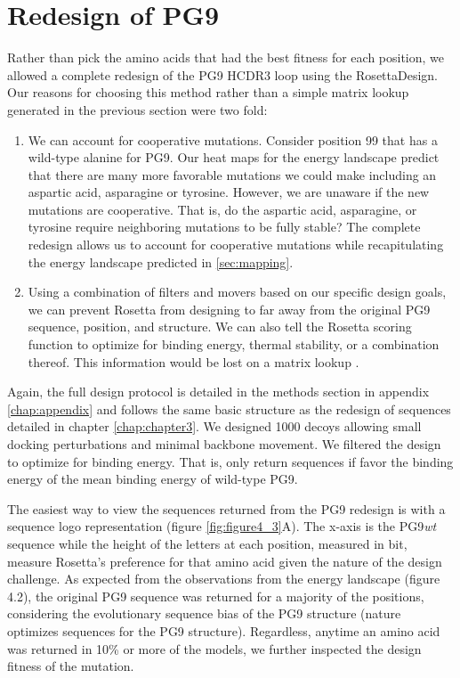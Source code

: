 \section{Redesign of PG9}
Rather than pick the amino acids that had the best fitness for each position, we allowed a complete redesign of the PG9 HCDR3 loop using the RosettaDesign. Our reasons for choosing this method rather than a simple matrix lookup generated in the previous section were two fold:
\begin{enumerate}
\item We can account for cooperative mutations. Consider position 99 that has a wild-type alanine for PG9. Our heat maps for the energy landscape predict that there are many more favorable mutations we could make including an aspartic acid, asparagine or tyrosine. However, we are unaware if the new mutations are cooperative. That is, do the aspartic acid, asparagine, or tyrosine require neighboring mutations to be fully stable? The complete redesign allows us to account for cooperative mutations while recapitulating the energy landscape predicted in \ref{sec:mapping}.
\item Using a combination of filters and movers based on our specific design goals, we can prevent Rosetta from designing to far away from the original PG9 sequence, position, and structure. We can also tell the Rosetta scoring function to optimize for binding energy, thermal stability, or a combination thereof. This information would be lost on a matrix lookup \citep{Fleishman:2011ji,Kaufmann:2010ea,Kuhlman:2000tc}.
\end{enumerate}

Again, the full design protocol is detailed in the methods section in appendix \ref{chap:appendix} and follows the same basic structure as the redesign of sequences detailed in chapter \ref{chap:chapter3}. We designed 1000 decoys allowing small docking perturbations and minimal backbone movement. We filtered the design to optimize for binding energy. That is, only return sequences if favor the binding energy of the mean binding energy of wild-type PG9.

The easiest way to view the sequences returned from the PG9 redesign is with a sequence logo representation (figure \ref{fig:figure4_3}A). The x-axis is the PG9\textit{wt} sequence while the height of the letters at each position, measured in bit, measure Rosetta's preference for that amino acid given the nature of the design challenge. As expected from the observations from the energy landscape (figure 4.2), the original PG9 sequence was returned for a majority of the positions, considering the evolutionary sequence bias of the PG9 structure (nature optimizes sequences for the PG9 structure).  Regardless, anytime an amino acid was returned in 10\% or more of the models, we further inspected the design fitness of the mutation.

